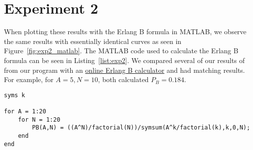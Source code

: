 \section*{Experiment 2}

When plotting these results with the Erlang B formula in MATLAB, we observe the same results with essentially identical curves as seen in Figure~\ref{fig:exp2_matlab}. The MATLAB code used to calculate the Erlang B formula can be seen in Listing~\ref{list:exp2}. We compared several of our results of from our program with an \href{https://owenduffy.net/traffic/erlangb.htm}{online Erlang B calculator} and had matching results. For example, for $A = 5, N = 10$, both calculated $P_B = 0.184$. 

\begin{lstlisting}[style=Matlab-editor,firstnumber=3,caption=Erlang B Formula, label=list:exp2]
syms k

for A = 1:20
	for N = 1:20
		PB(A,N) = ((A^N)/factorial(N))/symsum(A^k/factorial(k),k,0,N);
	end
end
\end{lstlisting}

